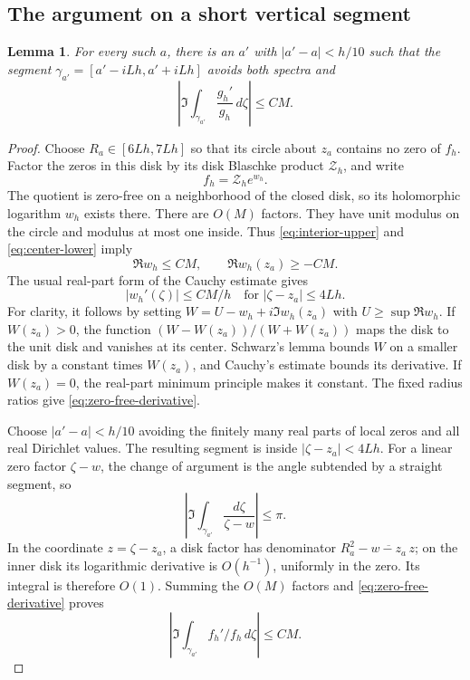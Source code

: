 \documentclass[11pt,a4paper]{article}
\newtheorem{lemma}[lemma]{Lemma}
\theoremstyle{remark}
\numberwithin{equation}{section}
\begin{document}
\subsection{The argument on a short vertical segment}
\begin{lemma}\label{lem:vertical}
For every such $a$, there is an $a'$ with $|a'-a|<h/10$ such that
the segment $\gamma_{a'}=[a'-iLh,a'+iLh]$ avoids both spectra and
\begin{equation}\label{eq:vertical-argument}
 \left|\Im\int_{\gamma_{a'}}\frac{g_h'}{g_h}\,d\zeta\right|\le CM.
\end{equation}
\end{lemma}
\begin{proof}
Choose $R_a\in[6Lh,7Lh]$ so that its circle about $z_a$ contains no
zero of $f_h$. Factor the zeros in this disk by its disk Blaschke
product $\mathcal Z_h$, and write
\[
 f_h=\mathcal Z_h e^{w_h}.
\]
The quotient is zero-free on a neighborhood of the closed disk, so its
holomorphic logarithm $w_h$ exists there. There are $O(M)$ factors.
They have unit modulus on the circle and modulus at most one inside.
Thus \eqref{eq:interior-upper} and \eqref{eq:center-lower} imply
\[
 \Re w_h\le CM,\qquad \Re w_h(z_a)\ge-CM.
\]
The usual real-part form of the Cauchy estimate gives
\begin{equation}\label{eq:zero-free-derivative}
 |w_h'(\zeta)|\le CM/h\quad\text{for }|\zeta-z_a|\le4Lh.
\end{equation}
For clarity, it follows by setting
$W=U-w_h+i\Im w_h(z_a)$ with $U\ge\sup\Re w_h$.
If $W(z_a)>0$, the function
$(W-W(z_a))/(W+W(z_a))$ maps the disk to the unit disk and vanishes
at its center. Schwarz's lemma bounds $W$ on a smaller disk by a
constant times $W(z_a)$, and Cauchy's estimate bounds its derivative.
If $W(z_a)=0$, the real-part minimum principle makes it constant.
The fixed radius ratios give \eqref{eq:zero-free-derivative}.

Choose $|a'-a|<h/10$ avoiding the finitely many real parts of local
zeros and all real Dirichlet values. The resulting segment is inside
$|\zeta-z_a|<4Lh$. For a linear zero factor $\zeta-w$, the change of argument is the
angle subtended by a straight segment, so
\[
 \left|\Im\int_{\gamma_{a'}}\frac{d\zeta}{\zeta-w}\right|\le\pi.
\] In the coordinate
$z=\zeta-z_a$, a disk factor has denominator
$R_a^2-\overline{w-z_a}\,z$; on the inner disk its logarithmic
derivative is $O(h^{-1})$, uniformly in the zero. Its integral is
therefore $O(1)$. Summing the $O(M)$ factors and
\eqref{eq:zero-free-derivative} proves
\[
 \left|\Im\int_{\gamma_{a'}}f_h'/f_h\,d\zeta\right|\le CM.
\]


\end{proof}
\end{document}

